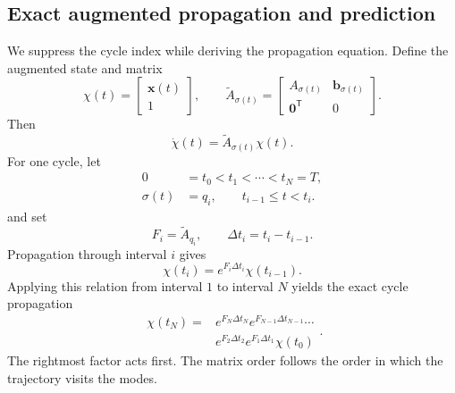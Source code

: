 \documentclass[pdflatex,iicol,sn-mathphys-ay]{sn-jnl}
\newcommand{\vect}[1]{\bm{#1}}
\begin{document}
\subsection{Exact augmented propagation and prediction}

We suppress the cycle index while deriving the propagation equation. Define the augmented state and matrix
\begin{equation}
    \chi(t)=\begin{bmatrix}\vect{x}(t)\\1\end{bmatrix},
    \qquad
    \widetilde A_{\sigma(t)}=
    \begin{bmatrix}
        A_{\sigma(t)}&\vect{b}_{\sigma(t)}\\
        \vect{0}^{\mathsf T}&0
    \end{bmatrix}.
\end{equation}
Then
\begin{equation}
    \boxed{\dot\chi(t)=\widetilde A_{\sigma(t)}\chi(t)}.
\end{equation}
For one cycle, let
\begin{equation}
\begin{aligned}
    0&=t_0<t_1<\cdots<t_N=T,\\
    \sigma(t)&=q_i,\qquad t_{i-1}\le t<t_i.
\end{aligned}
\end{equation}
and set
\begin{equation}
    F_i=\widetilde A_{q_i},
    \qquad
    \Delta t_i=t_i-t_{i-1}.
    \label{eq:augmented-generator}
\end{equation}
Propagation through interval $i$ gives
\begin{equation}
    \chi(t_i)=e^{F_i\Delta t_i}\chi(t_{i-1}).
\end{equation}
Applying this relation from interval $1$ to interval $N$ yields the exact cycle propagation
\begin{equation}
\boxed{\begin{aligned}
    \chi(t_N)={}&e^{F_N\Delta t_N}
    e^{F_{N-1}\Delta t_{N-1}}\cdots\\
    &e^{F_2\Delta t_2}e^{F_1\Delta t_1}\chi(t_0)
\end{aligned}}.
\label{eq:exact-augmented-cycle}
\end{equation}
The rightmost factor acts first. The matrix order follows the order in which the trajectory visits the modes.
\end{document}
